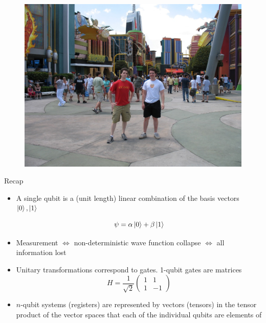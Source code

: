\documentclass{beamer}
\begin{document}
\begin{frame}
  \begin{figure}[ht]
    \includegraphics[scale=1.3]{pasted19}
  \end{figure}
\end{frame}

\begin{frame}{Recap}
  
\begin{itemize}
     \item A single qubit is a (unit length) linear combination of the basis vectors $\Ket{0},\Ket{1}$
  
       \[
       \psi=\alpha\Ket{0}+\beta\Ket{1}
       \] 
         
     \item Measurement $\iff$ non-deterministic wave function collapse $\iff$ all 
information lost
     \item Unitary transformations correspond to gates. 1-qubit gates are matrices 
       \[
       H=\frac{1}{\sqrt{2}}\begin{pmatrix}1 & 1\\
         1 & -1
       \end{pmatrix}
       \]

       \item $n$-qubit systems (registers) are represented by vectors (tensors) in the 
         tensor product of the vector spaces that each of the individual qubits are 
         elements of
\end{itemize}
\end{frame}
\end{document}
